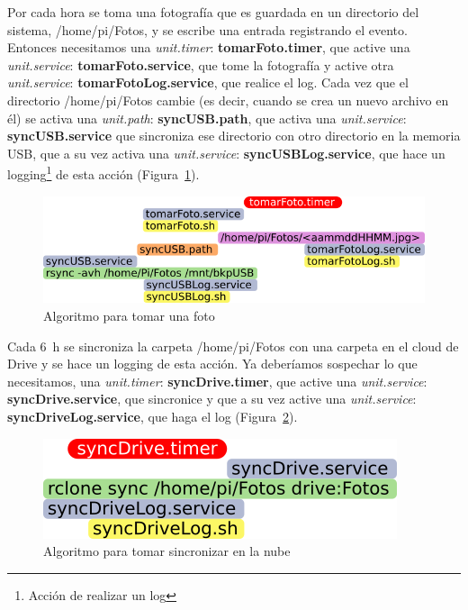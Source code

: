 \documentclass[10pt,a4paper]{article}
\begin{document}
Por cada hora se toma una fotograf\'ia que es guardada en un directorio del sistema, /home/pi/Fotos, y se escribe una entrada registrando el evento. Entonces necesitamos una \emph{unit.timer}: \textbf{tomarFoto.timer}, que active una \emph{unit.service}: \textbf{tomarFoto.service}, que tome la fotograf\'ia y active otra \emph{unit.service}: \textbf{tomarFotoLog.service}, que realice el log. Cada vez que el directorio /home/pi/Fotos cambie (es decir, cuando se crea un nuevo archivo en \'el) se activa una \emph{unit.path}: \textbf{syncUSB.path}, que activa una \emph{unit.service}: \textbf{syncUSB.service} que sincroniza ese directorio con otro directorio en la memoria USB, que a su vez activa una \emph{unit.service}: \textbf{syncUSBLog.service}, que hace un logging\footnote{Acci\'on de realizar un log} de esta acci\'on (Figura~\ref{fig:tomarFoto}).

\begin{figure}[h!]
\centering
    \includegraphics[scale=0.25]{pictos/tomarFoto.png}
    \caption{Algoritmo para tomar una foto}
    \label{fig:tomarFoto}
\end{figure}

Cada \SI{6}{h} se sincroniza la carpeta /home/pi/Fotos con una carpeta en el cloud de Drive y se hace un logging de esta acci\'on. Ya deber\'iamos sospechar lo que necesitamos, una \emph{unit.timer}: \textbf{syncDrive.timer}, que active una \emph{unit.service}: \textbf{syncDrive.service}, que sincronice y que a su vez active una \emph{unit.service}: \textbf{syncDriveLog.service}, que haga el log (Figura~\ref{fig:syncDrive}).

\begin{figure}[h!]
\centering
    \includegraphics[scale=0.25]{pictos/syncDriver.png}
    \caption{Algoritmo para tomar sincronizar en la nube}
    \label{fig:syncDrive}
\end{figure}
\end{document}

